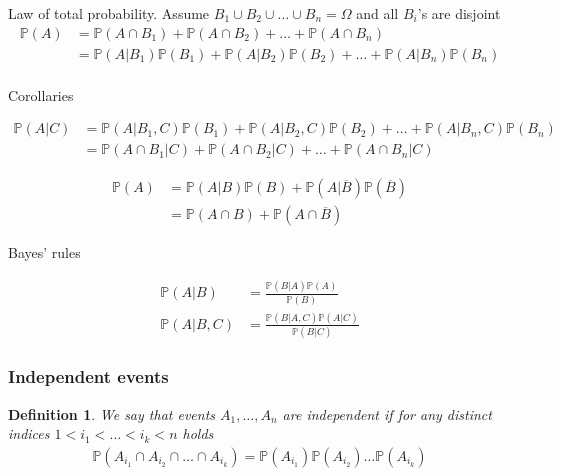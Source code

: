 \documentclass[10pt]{article}
\newtheorem*{definition}{Definition}
\begin{document}
Law of total probability. Assume $B_1\cup B_2\cup\ldots\cup B_n=\Omega$ and all
$B_i$'s are disjoint
\begin{align}
    \mathbb{P}(A)
     & =\mathbb{P}(A\cap B_1)+\mathbb{P}(A\cap B_2)+
    \ldots+\mathbb{P}(A\cap B_n)                     \\
     & =\mathbb{P}(A| B_1)\mathbb{P}(B_1)+
    \mathbb{P}(A| B_2)\mathbb{P}(B_2)+
    \ldots+
    \mathbb{P}(A| B_n)\mathbb{P}(B_n)                \\
\end{align}

Corollaries

\begin{align}
    \mathbb{P}(A|C)
     & =\mathbb{P}(A|B_1,C)\mathbb{P}(B_1)+
    \mathbb{P}(A|B_2,C)\mathbb{P}(B_2)+
    \ldots+
    \mathbb{P}(A|B_n,C)\mathbb{P}(B_n)      \\
     & =\mathbb{P}(A\cap B_1|C)+
    \mathbb{P}(A\cap B_2|C)+
    \ldots+
    \mathbb{P}(A\cap B_n|C)
\end{align}

\begin{align}
    \mathbb{P}(A)
     & =\mathbb{P}(A|B)\mathbb{P}(B)+
    \mathbb{P}(A|\overline{B})\mathbb{P}(\overline{B}) \\
     & =\mathbb{P}(A\cap B)+
    \mathbb{P}(A\cap\overline{B})
\end{align}

Bayes' rules


\begin{align}
    \mathbb{P}(A|B)   &
    = \frac{\mathbb{P}(B|A)\mathbb{P}(A)}{\mathbb{P}(B)} \\
    \mathbb{P}(A|B,C) &
    =\frac{\mathbb{P}(B|A,C)\mathbb{P}(A|C)}{\mathbb{P}(B|C)}
\end{align}

\subsubsection{Independent events}

\begin{definition}
    We say that events $A_1,\ldots ,A_n$ are independent if for any distinct
    indices $1<i_1<\ldots<i_k<n$ holds  %
    \begin{align}
        \mathbb{P}(A_{i_1}\cap A_{i_2}\cap\ldots\cap A_{i_k})=
        \mathbb{P}(A_{i_1})\mathbb{P}(A_{i_2})\ldots\mathbb{P}(A_{i_k})
    \end{align}
\end{definition}
\end{document}
